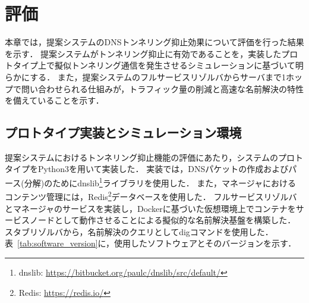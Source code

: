 \section{評価}
\label{sec:evaluation}
本章では，提案システムのDNSトンネリング抑止効果について評価を行った結果を示す．
提案システムがトンネリング抑止に有効であることを，実装したプロトタイプ上で擬似トンネリング通信を発生させるシミュレーションに基づいて明らかにする．
また，提案システムのフルサービスリゾルバからサーバまで1ホップで問い合わせられる仕組みが，トラフィック量の削減と高速な名前解決の特性を備えていることを示す．


%

\subsection{プロトタイプ実装とシミュレーション環境}
\label{sec:simulation}
提案システムにおけるトンネリング抑止機能の評価にあたり，システムのプロトタイプをPython3を用いて実装した．
実装では，DNSパケットの作成およびパース(分解)のためにdnslib\footnote{dnslib: \href{https://bitbucket.org/paulc/dnslib/src/default/}{https://bitbucket.org/paulc/dnslib/src/default/}}ライブラリを使用した．
また，マネージャにおけるコンテンツ管理には，Redis\footnote{Redis: \href{https://redis.io/}{https://redis.io/}}データベースを使用した．
フルサービスリゾルバとマネージャのサービスを実装し，Dockerに基づいた仮想環境上でコンテナをサービスノードとして動作させることによる擬似的な名前解決基盤を構築した．
スタブリゾルバから，名前解決のクエリとしてdigコマンドを使用した．
表~\ref{tab:software_version}に，使用したソフトウェアとそのバージョンを示す．



